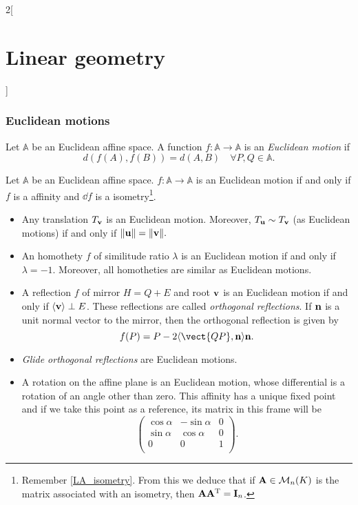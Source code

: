 \documentclass[../../../main.tex]{subfiles}
\begin{document}
\begin{multicols}{2}[\section{Linear geometry}]
  \subsubsection{Euclidean motions}
  \label{LG_euclidean_motion}
  \begin{definition}
    Let $\mathbb{A}$ be an Euclidean affine space. A function $f:\mathbb{A}\rightarrow\mathbb{A}$ is an \textit{Euclidean motion} if $$d(f(A),f(B))=d(A,B)\quad\forall P,Q\in\mathbb{A}.$$
  \end{definition}
  \begin{prop}
    Let $\mathbb{A}$ be an Euclidean affine space. $f:\mathbb{A}\rightarrow\mathbb{A}$ is an Euclidean motion if and only if $f$ is a affinity and $\dd f$ is a isometry\footnote{Remember \cref{LA_isometry}. From this we deduce that if $\boldsymbol{\mathrm{A}}\in\mathcal{M}_n(K)$ is the matrix associated with an isometry, then $\boldsymbol{\mathrm{A}}\vb{A}^{\mathrm{T}}=\boldsymbol{\mathrm{I}}_n$.}.
  \end{prop}
  \begin{prop}
    \hfill
    \begin{itemize}
      \item Any translation $T_{\boldsymbol{\mathrm{v}}}$ is an Euclidean motion. Moreover, $T_{\boldsymbol{\mathrm{u}}}\sim T_{\boldsymbol{\mathrm{v}}}$ (as Euclidean motions) if and only if $\|\boldsymbol{\mathrm{u}}\|=\|\boldsymbol{\mathrm{v}}\|.$
      \item An homothety $f$ of similitude ratio $\lambda$ is an Euclidean motion if and only if $\lambda=-1$. Moreover, all homotheties are similar as Euclidean motions.
      \item A reflection $f$ of mirror $H=Q+E$ and root $\boldsymbol{\mathrm{v}}$ is an Euclidean motion if and only if $\langle\boldsymbol{\mathrm{v}}\rangle\perp E$. These reflections are called \textit{orthogonal reflections}. If $\boldsymbol{\mathrm{n}}$ is a unit normal vector to the mirror, then the orthogonal reflection is given by $$f(P)=P-2\langle\vect{QP},\vectorfunction{n}\rangle\vectorfunction{n}.$$
      \item \textit{Glide orthogonal reflections} are Euclidean motions.
      \item A rotation on the affine plane is an Euclidean motion, whose differential is a rotation of an angle other than zero. This affinity has a unique fixed point and if we take this point as a reference, its matrix in this frame will be $$\begin{pmatrix}
                \cos\alpha & -\sin\alpha & 0 \\
                \sin\alpha & \cos\alpha  & 0 \\
                0          & 0           & 1 \\
              \end{pmatrix}.$$
    \end{itemize}
  \end{prop}

\end{multicols}
\end{document}
